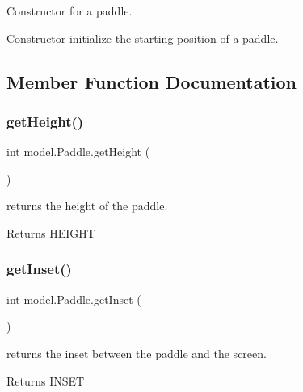 Constructor for a paddle. 

Constructor initialize the starting position of a paddle. 

\subsection{Member Function Documentation}
\hypertarget{classmodel_1_1_paddle_a6a997888d6e6fa0586357382b6ef3040}{}\label{classmodel_1_1_paddle_a6a997888d6e6fa0586357382b6ef3040} 
\subsubsection{\texorpdfstring{get\+Height()}{getHeight()}}
{\footnotesize\ttfamily int model.\+Paddle.\+get\+Height (\begin{DoxyParamCaption}{ }\end{DoxyParamCaption})}



returns the height of the paddle. 

\begin{DoxyReturn}{Returns}
H\+E\+I\+G\+HT 
\end{DoxyReturn}
\hypertarget{classmodel_1_1_paddle_af9f7a4aa1023dfe606d977b3bafcb4fa}{}\label{classmodel_1_1_paddle_af9f7a4aa1023dfe606d977b3bafcb4fa} 
\subsubsection{\texorpdfstring{get\+Inset()}{getInset()}}
{\footnotesize\ttfamily int model.\+Paddle.\+get\+Inset (\begin{DoxyParamCaption}{ }\end{DoxyParamCaption})}



returns the inset between the paddle and the screen. 

\begin{DoxyReturn}{Returns}
I\+N\+S\+ET 
\end{DoxyReturn}
\hypertarget{classmodel_1_1_paddle_ae5abcff6c1e4f424284a42265b3eb8fd}{}\label{classmodel_1_1_paddle_ae5abcff6c1e4f424284a42265b3eb8fd} 
